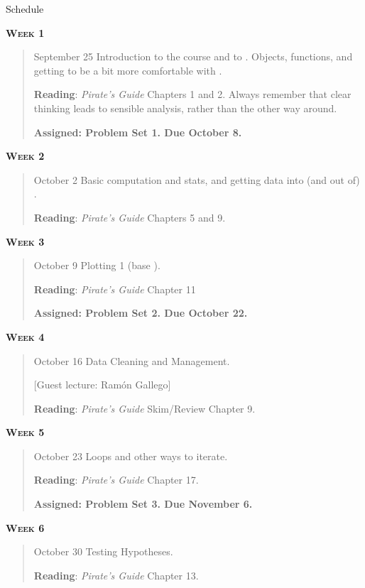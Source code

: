 \documentclass[11pt,letterpaper]{article}
\begin{document}
\pagebreak

\huge Schedule
\hrulefill

\normalsize


\textbf{\textsc{Week 1}}
		\begin{quote}	
		September 25 \textbullet \space Introduction to the course and to \R. Objects, functions, and getting to be a bit more comfortable with \R.
		
		\textbf{Reading}: \textit{Pirate's Guide} Chapters 1 and 2. 
		Always remember that clear thinking leads to sensible analysis, rather than the other way around.
		
		\textbf{Assigned: Problem Set 1.  Due October 8.}
		
		\end{quote}

\textbf{\textsc{Week 2}}
		\begin{quote}	
		October 2  \textbullet \space Basic computation and stats, and getting data into (and out of) \R. 
		
		\textbf{Reading}: \textit{Pirate's Guide} Chapters 5 and 9.	
		\end{quote}

\textbf{\textsc{Week 3}}
		\begin{quote}	
		October 9  \textbullet \space Plotting 1 (base \R). 
		
		\textbf{Reading}: \textit{Pirate's Guide} Chapter 11

		\textbf{Assigned: Problem Set 2.  Due October 22.}

		\end{quote}

\textbf{\textsc{Week 4}}
		\begin{quote}	
		October 16  \textbullet \space Data Cleaning and Management. 
		
		[Guest lecture: Ramón Gallego]
		
		\textbf{Reading}: \textit{Pirate's Guide} Skim/Review Chapter 9.
		\end{quote}


\textbf{\textsc{Week 5}}
		\begin{quote}	
		October 23  \textbullet \space Loops and other ways to iterate. 
		
		\textbf{Reading}: \textit{Pirate's Guide} Chapter 17.

		\textbf{Assigned: Problem Set 3.  Due November 6.}

		\end{quote}

\textbf{\textsc{Week 6}}
		\begin{quote}	
		October 30  \textbullet \space Testing Hypotheses. 
		
		\textbf{Reading}: \textit{Pirate's Guide} Chapter 13.
		\end{quote}
\end{document}
